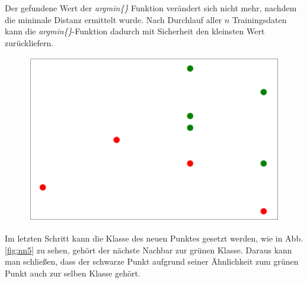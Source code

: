 \documentclass[fontsize=11pt]{scrartcl}
\begin{document}
                        

                  Der gefundene Wert der \emph{argmin\{\}} Funktion verändert sich nicht mehr, nachdem die minimale Distanz ermittelt wurde. Nach Durchlauf aller $n$ Trainingsdaten kann die \emph{argmin\{\}}-Funktion dadurch mit Sicherheit den kleinsten Wert zurückliefern.\par
                   
               	\begin{figure}
                       \includegraphics[scale=0.2]{nn6.png}
                        \label{fig:nn6}
                \end{figure}
                
                Im letzten Schritt kann die Klasse des neuen Punktes gesetzt werden, wie in Abb. \ref{fig:nn5} zu sehen, gehört der nächste Nachbar zur grünen Klasse. Daraus kann man schließen, dass der schwarze Punkt aufgrund seiner Ähnlichkeit zum grünen Punkt auch zur selben Klasse gehört.\par
                        
\end{document}
